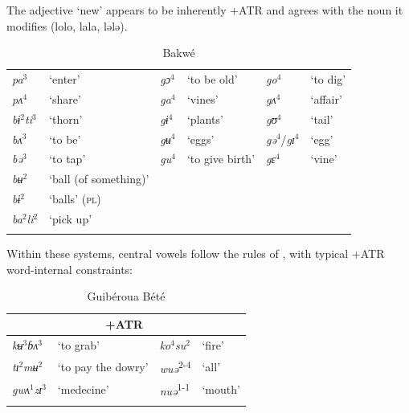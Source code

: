 \documentclass[output=paper,newtxmath,modfonts,nonflat,draft]{langsci/langscibook}
\begin{document}
The adjective ‘new’ appears to be inherently +ATR and agrees with the noun it modifies (lolo, lala, lələ).

\begin{table}
\caption{Bakwé \citep{centredetraduction2006}}
\label{tab:zogbo:7}
\begin{tabular}{llllll}
\lsptoprule
\textit{pa}$^3$ &   ‘enter’  &  \textit{gɔ}$^4$    & ‘to be old’ &  \textit{go}$^4$ &    ‘to dig’\\

\textit{pʌ}$^4$  &   ‘share’    & \textit{ga}$^4$ &   ‘vines’     & \textit{gʌ}$^4$ &    ‘affair’\\

\textit{bɨ}$^2$\textit{ti}$^3$ & ‘thorn’ &    \textit{gɨ}$^4$ &   ‘plants’  & \textit{gʊ}$^4$ &    ‘tail’\\

\textit{bʌ}$^3$ & ‘to be’ &    \textit{gʉ}$^4$ &   ‘eggs’  &   \textit{gə}$^4$/\textit{gɪ}$^4$ & ‘egg’\\

\textit{bə}$^3$ & ‘to tap’ &    \textit{gu}$^4$   & ‘to give birth’ &  \textit{gɛ}$^4$  &   ‘vine’\\

\textit{bʉ}$^2$ & ‘ball (of something)’\\

\textit{bɨ}$^2$ & ‘balls’ (\textsc{pl})\\

\textit{ba}$^2$\textit{li}$^2$ & ‘pick up’\\
\lspbottomrule
\end{tabular}
\end{table}

Within these systems, central vowels follow the rules of , with typical +ATR word-internal constraints:   

\newline

\begin{table}
\caption{Guibéroua Bété \citep{Werle1976}}
\label{tab:zogbo:8}
\begin{tabular}{llll}
\lsptoprule
\multicolumn{2}{c}{−ATR} & \multicolumn{2}{c}{+ATR}\\
\midrule
\textit{kʉ}$^3$\textit{ɓʌ}$^3$ &  ‘to grab’ &      \textit{ko}$^4$\textit{su}$^2$ &   ‘fire’\\

\textit{tɪ}$^2$\textit{mʉ}$^2$ & ‘to pay the dowry’  &  \textit{wuə}\textsuperscript{2-4} & ‘all’\\

\textit{gwʌ}$^1$\textit{zɪ}$^3$ &  ‘medecine’      & \textit{nuə}\textsuperscript{1-1}  &   ‘mouth’\\
\lspbottomrule
\end{tabular}
\end{table}
\end{document}
